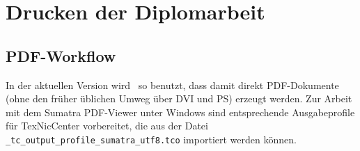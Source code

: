 \chapter{Drucken der Diplomarbeit}
\label{chap:Drucken}




\section{PDF-Workflow}
\label{sec:pdf}

In der aktuellen Version wird \latex\ so benutzt, dass damit direkt PDF-Dokumente (ohne den früher üblichen Umweg über DVI und PS) erzeugt werden.
Zur Arbeit mit dem Sumatra PDF-Viewer unter Windows sind entsprechende Ausgabeprofile für TexNicCenter vorbereitet, die aus der Datei \verb!_tc_output_profile_sumatra_utf8.tco! 
importiert werden können. %


